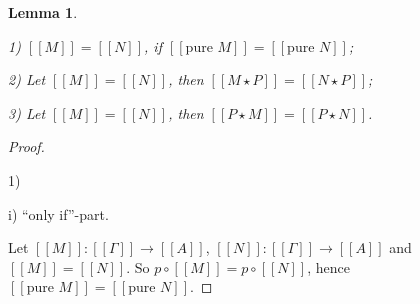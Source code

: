 \documentclass[a4paper]{article}
\newtheorem{lemma}{Lemma}
\begin{document}
\begin{lemma}
$ $

1) $[\![M]\!] = [\![N]\!]$, if $[\![\text{pure }  M]\!] = [\![\text{pure } N]\!]$;

2) Let $[\![M]\!] = [\![N]\!]$, then $[\![M \star P]\!] = [\![N \star P]\!]$;

3) Let $[\![M]\!] = [\![N]\!]$, then $[\![P \star M]\!] = [\![P \star N]\!]$.
\end{lemma}

\begin{proof}

$ $

1)

i) ``only if''-part.

Let $[\![M]\!] : [\![\Gamma]\!] \to [\![A]\!]$, $[\![N]\!] : [\![\Gamma]\!] \to [\![A]\!]$ and $[\![M]\!] =
[\![N]\!]$. So $p \circ [\![M]\!] = p \circ [\![N]\!]$, hence $[\![\text{pure } M]\!] = [\![\text{pure }
N]\!]$.


\end{proof}
\end{document}
